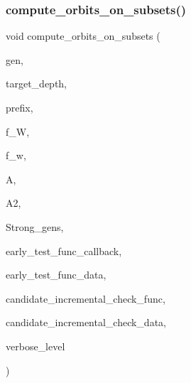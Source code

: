 \subsubsection{\texorpdfstring{compute\+\_\+orbits\+\_\+on\+\_\+subsets()}{compute\_orbits\_on\_subsets()}}
{\footnotesize\ttfamily void compute\+\_\+orbits\+\_\+on\+\_\+subsets (\begin{DoxyParamCaption}\item[{\mbox{\hyperlink{classgenerator}{generator}} $\ast$\&}]{gen,  }\item[{\mbox{\hyperlink{galois_8h_a09fddde158a3a20bd2dcadb609de11dc}{I\+NT}}}]{target\+\_\+depth,  }\item[{const \mbox{\hyperlink{galois_8h_ab6cc7b4aeb6ea31aba2b3fbfc83ff5e6}{B\+Y\+TE}} $\ast$}]{prefix,  }\item[{\mbox{\hyperlink{galois_8h_a09fddde158a3a20bd2dcadb609de11dc}{I\+NT}}}]{f\+\_\+W,  }\item[{\mbox{\hyperlink{galois_8h_a09fddde158a3a20bd2dcadb609de11dc}{I\+NT}}}]{f\+\_\+w,  }\item[{\mbox{\hyperlink{classaction}{action}} $\ast$}]{A,  }\item[{\mbox{\hyperlink{classaction}{action}} $\ast$}]{A2,  }\item[{\mbox{\hyperlink{classstrong__generators}{strong\+\_\+generators}} $\ast$}]{Strong\+\_\+gens,  }\item[{void($\ast$)(\mbox{\hyperlink{galois_8h_a09fddde158a3a20bd2dcadb609de11dc}{I\+NT}} $\ast$\mbox{\hyperlink{simeon_8_c_adab47f8243f1b5a2c31df2535d6b37d0}{S}}, \mbox{\hyperlink{galois_8h_a09fddde158a3a20bd2dcadb609de11dc}{I\+NT}} len, \mbox{\hyperlink{galois_8h_a09fddde158a3a20bd2dcadb609de11dc}{I\+NT}} $\ast$candidates, \mbox{\hyperlink{galois_8h_a09fddde158a3a20bd2dcadb609de11dc}{I\+NT}} nb\+\_\+candidates, \mbox{\hyperlink{galois_8h_a09fddde158a3a20bd2dcadb609de11dc}{I\+NT}} $\ast$good\+\_\+candidates, \mbox{\hyperlink{galois_8h_a09fddde158a3a20bd2dcadb609de11dc}{I\+NT}} \&nb\+\_\+good\+\_\+candidates, void $\ast$data, \mbox{\hyperlink{galois_8h_a09fddde158a3a20bd2dcadb609de11dc}{I\+NT}} \mbox{\hyperlink{simeon_8_c_a818073fbcc2f439e7c56952f67386122}{verbose\+\_\+level}})}]{early\+\_\+test\+\_\+func\+\_\+callback,  }\item[{void $\ast$}]{early\+\_\+test\+\_\+func\+\_\+data,  }\item[{\mbox{\hyperlink{galois_8h_a09fddde158a3a20bd2dcadb609de11dc}{I\+NT}}($\ast$)(\mbox{\hyperlink{galois_8h_a09fddde158a3a20bd2dcadb609de11dc}{I\+NT}} len, \mbox{\hyperlink{galois_8h_a09fddde158a3a20bd2dcadb609de11dc}{I\+NT}} $\ast$\mbox{\hyperlink{simeon_8_c_adab47f8243f1b5a2c31df2535d6b37d0}{S}}, void $\ast$data, \mbox{\hyperlink{galois_8h_a09fddde158a3a20bd2dcadb609de11dc}{I\+NT}} \mbox{\hyperlink{simeon_8_c_a818073fbcc2f439e7c56952f67386122}{verbose\+\_\+level}})}]{candidate\+\_\+incremental\+\_\+check\+\_\+func,  }\item[{void $\ast$}]{candidate\+\_\+incremental\+\_\+check\+\_\+data,  }\item[{\mbox{\hyperlink{galois_8h_a09fddde158a3a20bd2dcadb609de11dc}{I\+NT}}}]{verbose\+\_\+level }\end{DoxyParamCaption})}

